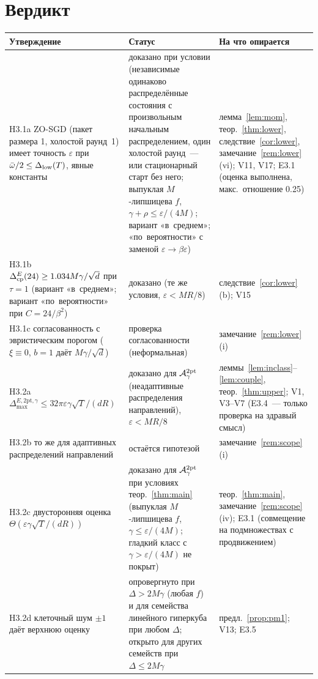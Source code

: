 \documentclass[11pt,a4paper]{article}
\numberwithin{equation}{section}
\theoremstyle{definition}
\theoremstyle{remark}
\newcommand{\Dmax}{\Delta_{\max}}\newcommand{\Dcp}{\Delta_{\rm cp}}\newcommand{\Dlow}{\Delta_{\rm low}}
\newcommand{\wbar}{\bar\omega}\newcommand{\Atwo}{\cA^{\rm 2pt}_\gamma}
\begin{document}
\section{Вердикт}\label{sec:verdict}
{\small
\begin{xltabular}{\textwidth}{@{}>{\raggedright\arraybackslash}p{5.3cm}>{\raggedright\arraybackslash}p{4.6cm}>{\raggedright\arraybackslash}X@{}}
\toprule
Утверждение & Статус & На что опирается\\
\midrule
\endhead
H3.1a ZO-SGD (пакет размера 1, холостой раунд~1) имеет точность $\varepsilon$ при $\wbar/2\le\Dlow(T)$, явные константы & доказано при условии (независимые одинаково распределённые состояния с произвольным начальным распределением, один холостой раунд~--- или стационарный старт без него; выпуклая $M$-липшицева $f$, $\gamma+\rho\le\varepsilon/(4M)$; вариант «в~среднем»; «по~вероятности» с заменой $\varepsilon\to\beta\varepsilon$) & лемма~\ref{lem:mom}, теор.~\ref{thm:lower}, следствие~\ref{cor:lower}, замечание~\ref{rem:lower}(vi); V11, V17; E3.1 (оценка выполнена, макс.\ отношение 0.25)\\
H3.1b $\Dcp^E(24)\ge1.034M\gamma/\sqrt d$ при $\tau=1$ (вариант «в~среднем»; вариант «по~вероятности» при $C=24/\beta^2$) & доказано (те же условия, $\varepsilon<MR/8$) & следствие~\ref{cor:lower}(b); V15\\
H3.1c согласованность с эвристическим порогом ($\xi\equiv0$, $b=1$ даёт $M\gamma/\sqrt d$) & проверка согласованности (неформальная) & замечание~\ref{rem:lower}(i)\\
H3.2a $\Dmax^{E,\mathrm{2pt},\gamma}\le32\pi\varepsilon\gamma\sqrt T/(dR)$ & доказано для $\Atwo$ (неадаптивные распределения направлений), $\varepsilon<MR/8$ & леммы~\ref{lem:inclass}--\ref{lem:couple}, теор.~\ref{thm:upper}; V1, V3--V7 (E3.4~--- только проверка на здравый смысл)\\
H3.2b то же для адаптивных распределений направлений & остаётся гипотезой & замечание~\ref{rem:scope}(i)\\
H3.2c двусторонняя оценка $\Theta(\varepsilon\gamma\sqrt T/(dR))$ & доказано для $\Atwo$ при условиях теор.~\ref{thm:main} (выпуклая $M$-липшицева $f$, $\gamma\le\varepsilon/(4M)$; гладкий класс с $\gamma>\varepsilon/(4M)$ не покрыт) & теор.~\ref{thm:main}, замечание~\ref{rem:scope}(iv); E3.1 (совмещение на подмножествах с продвижением)\\
H3.2d клеточный шум $\pm1$ даёт верхнюю оценку & опровергнуто при $\Delta>2M\gamma$ (любая $f$) и для семейства линейного гиперкуба при любом $\Delta$; открыто для других семейств при $\Delta\le2M\gamma$ & предл.~\ref{prop:pm1}; V13; E3.5\\

\end{xltabular}}
\end{document}
